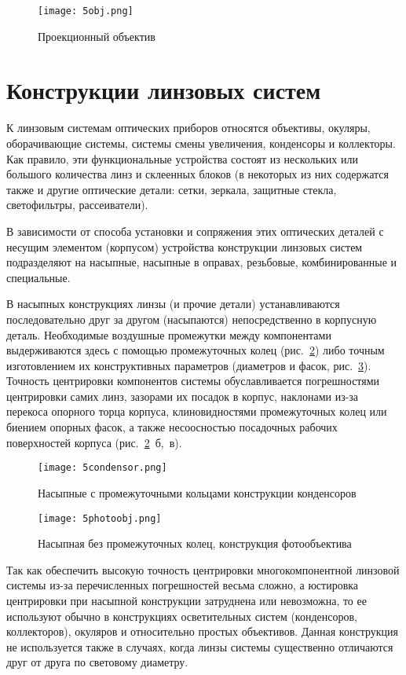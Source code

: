 \begin{figure}[h!]
	\caption{ Проекционный объектив }
	\texttt{[image: 5obj.png]}
	\label{pic:5obj}
\end{figure}

\section{Конструкции линзовых систем}

К линзовым системам оптических приборов относятся объективы, окуляры, оборачивающие системы, системы смены увеличения, конденсоры и коллекторы. Как правило, эти функциональные устройства состоят из нескольких или большого количества линз и склеенных блоков (в некоторых из них содержатся также и другие оптические детали: сетки, зеркала, защитные стекла, светофильтры, рассеиватели).

В зависимости от способа установки и сопряжения этих оптических деталей с несущим элементом (корпусом) устройства конструкции линзовых систем подразделяют на насыпные, насыпные в оправах, резьбовые, комбинированные и специальные. 

В насыпных конструкциях линзы (и прочие детали) устанавливаются последовательно друг за другом (насыпаются) непосредственно в корпусную деталь. Необходимые воздушные промежутки между компонентами выдерживаются здесь с помощью промежуточных колец (рис.~\ref{pic:5condensor}) либо точным изготовлением их конструктивных параметров (диаметров и фасок, рис.~\ref{pic:5photoobj}). Точность центрировки компонентов системы обуславливается погрешностями центрировки самих линз, зазорами их посадок в корпус, наклонами из-за перекоса опорного торца корпуса, клиновидностями промежуточных колец или биением опорных фасок, а также несоосностью посадочных рабочих поверхностей корпуса (рис.~\ref{pic:5condensor}~б,~в).

\begin{figure}[h!]
	\caption{ Насыпные с промежуточными кольцами конструкции конденсоров }
	\texttt{[image: 5condensor.png]}
	\label{pic:5condensor}
\end{figure}

\begin{figure}[h!]
	\caption{ Насыпная без промежуточных колец, конструкция фотообъектива }
	\texttt{[image: 5photoobj.png]}
	\label{pic:5photoobj}
\end{figure}

Так как обеспечить высокую точность центрировки многокомпонентной линзовой системы из-за перечисленных погрешностей весьма сложно, а юстировка центрировки при насыпной конструкции затруднена или невозможна, то ее используют обычно в конструкциях осветительных систем (конденсоров, коллекторов), окуляров и относительно простых объективов. Данная конструкция не используется также в случаях, когда линзы системы существенно отличаются друг от друга по световому диаметру.

